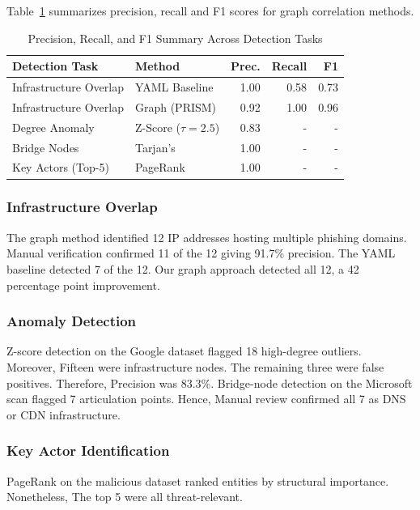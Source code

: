\documentclass[conference]{IEEEtran}
\begin{document}
Table~\ref{tab:precision_recall} summarizes precision, recall and F1 scores for graph correlation methods.

\begin{table}[htbp]
\centering
\caption{Precision, Recall, and F1 Summary Across Detection Tasks}
\label{tab:precision_recall}
\begin{tabular}{@{}llrrr@{}}
\toprule
\textbf{Detection Task} & \textbf{Method} & \textbf{Prec.} & \textbf{Recall} & \textbf{F1} \\
\midrule
Infrastructure Overlap & YAML Baseline & 1.00 & 0.58 & 0.73 \\
Infrastructure Overlap & Graph (PRISM) & 0.92 & 1.00 & 0.96 \\
Degree Anomaly & Z-Score ($\tau=2.5$) & 0.83 &  -  &  -  \\
Bridge Nodes & Tarjan's & 1.00 &  -  &  -  \\
Key Actors (Top-5) & PageRank & 1.00 &  -  &  -  \\
\bottomrule
\end{tabular}
\end{table}

\subsubsection{Infrastructure Overlap}

The graph method identified 12 IP addresses hosting multiple phishing domains. Manual verification confirmed 11 of the 12 giving 91.7\% precision. The YAML baseline detected 7 of the 12. Our graph approach detected all 12, a 42 percentage point improvement.

\subsubsection{Anomaly Detection}

Z-score detection on the Google dataset flagged 18 high-degree outliers. Moreover, Fifteen were infrastructure nodes. The remaining three were false positives. Therefore, Precision was 83.3\%. Bridge-node detection on the Microsoft scan flagged 7 articulation points. Hence, Manual review confirmed all 7 as DNS or CDN infrastructure.

\subsubsection{Key Actor Identification}

PageRank on the malicious dataset ranked entities by structural importance. Nonetheless, The top 5 were all threat-relevant.
\end{document}
